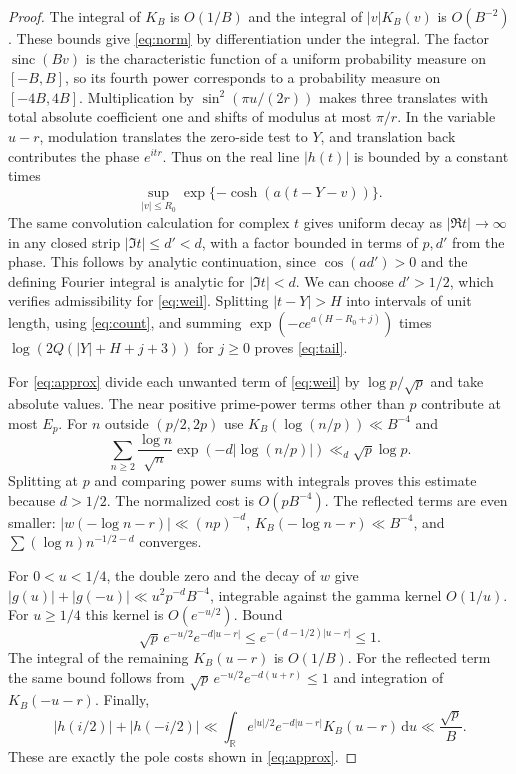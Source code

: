 \documentclass[11pt]{article}
\newcommand{\R}{\mathbb R}\newcommand{\C}{\mathbb C}
\newcommand{\dd}{\,\mathrm d}
\newcommand{\sinc}{\operatorname{sinc}}
\begin{document}
\begin{proof}
The integral of $K_B$ is $O(1/B)$ and the integral of $|v|K_B(v)$ is $O(B^{-2})$. These bounds give \eqref{eq:norm} by differentiation under the integral. The factor $\sinc(Bv)$ is the characteristic function of a uniform probability measure on $[-B,B]$, so its fourth power corresponds to a probability measure on $[-4B,4B]$. Multiplication by $\sin^2(\pi u/(2r))$ makes three translates with total absolute coefficient one and shifts of modulus at most $\pi/r$. In the variable $u-r$, modulation translates the zero-side test to $Y$, and translation back contributes the phase $e^{itr}$. Thus on the real line $|h(t)|$ is bounded by a constant times
\[
 \sup_{|v|\le R_0}\exp\{-\cosh(a(t-Y-v))\}.
\]
The same convolution calculation for complex $t$ gives uniform decay as $|\Re t|\to\infty$ in any closed strip $|\Im t|\le d'<d$, with a factor bounded in terms of $p,d'$ from the phase. This follows by analytic continuation, since $\cos(ad')>0$ and the defining Fourier integral is analytic for $|\Im t|<d$. We can choose $d'>1/2$, which verifies admissibility for \eqref{eq:weil}. Splitting $|t-Y|>H$ into intervals of unit length, using \eqref{eq:count}, and summing $\exp(-c e^{a(H-R_0+j)})$ times $\log(2Q(|Y|+H+j+3))$ for $j\ge0$ proves \eqref{eq:tail}.

For \eqref{eq:approx} divide each unwanted term of \eqref{eq:weil} by $\log p/\sqrt p$ and take absolute values. The near positive prime-power terms other than $p$ contribute at most $E_p$. For $n$ outside $(p/2,2p)$ use $K_B(\log(n/p))\ll B^{-4}$ and
\[
 \sum_{n\ge2}\frac{\log n}{\sqrt n}\exp(-d|\log(n/p)|)
 \ll_d \sqrt p\log p .
\]
Splitting at $p$ and comparing power sums with integrals proves this estimate because $d>1/2$. The normalized cost is $O(pB^{-4})$. The reflected terms are even smaller: $|w(-\log n-r)|\ll (np)^{-d}$, $K_B(-\log n-r)\ll B^{-4}$, and $\sum(\log n)n^{-1/2-d}$ converges.

For $0<u<1/4$, the double zero and the decay of $w$ give
$|g(u)|+|g(-u)|\ll u^2p^{-d}B^{-4}$, integrable against the gamma kernel $O(1/u)$. For $u\ge1/4$ this kernel is $O(e^{-u/2})$. Bound
\[
 \sqrt p\,e^{-u/2}e^{-d|u-r|}
 \le e^{-(d-1/2)|u-r|}\le1.
\]
The integral of the remaining $K_B(u-r)$ is $O(1/B)$. For the reflected term the same bound follows from $\sqrt p\, e^{-u/2}e^{-d(u+r)}\le1$ and integration of $K_B(-u-r)$. Finally,
\[
 |h(i/2)|+|h(-i/2)|
 \ll \int_\R e^{|u|/2}e^{-d|u-r|}K_B(u-r)\dd u
 \ll \frac{\sqrt p}{B}.
\]
These are exactly the pole costs shown in \eqref{eq:approx}.
\end{proof}
\end{document}
